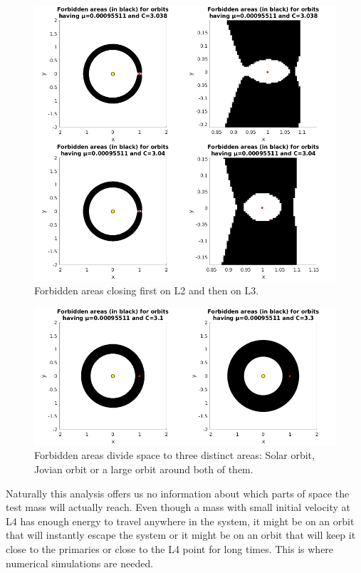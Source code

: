 \documentclass[12pt,a4paper,titlepage]{article}
\begin{document}
\begin{figure}
\centering
\includegraphics[width=\textwidth]{../plots/allowed/zooms.png}
\caption{Forbidden areas closing first on L2 and then on L3.}
\label{zooms}
\end{figure}


\begin{figure}
\centering
\includegraphics[width=\textwidth]{../plots/allowed/closed.png}
\caption{Forbidden areas divide space to three distinct areas: Solar orbit, Jovian orbit or a large orbit around both of them.}
\label{closed}
\end{figure}

Naturally this analysis offers us no information about which parts of space the test mass will actually reach. Even though a mass with small initial velocity at L4 has enough energy to travel anywhere in the system, it might be on an orbit that will instantly escape the system or it might be on an orbit that will keep it close to the primaries or close to the L4 point for long times. This is where numerical simulations are needed.
\end{document}
